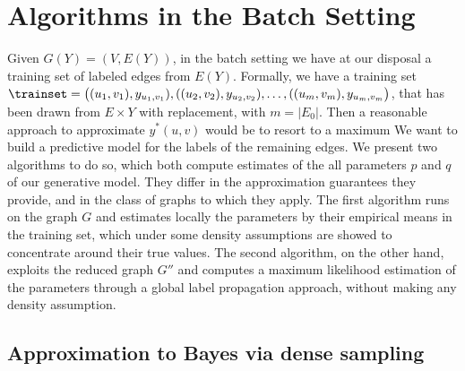 \section{Algorithms in the Batch Setting}\label{s:algbatch}

Given $G(Y) =(V,E(Y))$, in the batch setting we have at our disposal a training set \trainset{} of
labeled edges from $E(Y)$. Formally, we have a training set $\trainset
= \big((u_1,v_1),y_{u_1,v_1}), ((u_2,v_2),y_{u_2,v_2}), \ldots, ((u_m,v_m),y_{u_m,v_m}\big)$, that
has been drawn from $E\times Y$ \uar{} with replacement, with
$m = |E_0|$. Then a reasonable approach to approximate $y^*(u,v)$ would be to resort to a maximum
 We want to build a predictive model for the labels of the remaining
edges. We present two algorithms to do so, which both compute estimates of the all parameters $p$
and $q$ of our generative model. They differ in the approximation guarantees they provide, and in
the class of graphs to which they apply. The first algorithm runs on the graph $G$ and estimates
locally the parameters by their empirical means in the training set, which under some density
assumptions are showed to concentrate around their true values. The second algorithm, on the other
hand, exploits the reduced graph $G''$ and computes a maximum likelihood estimation of the
parameters through a global label propagation approach, without making any density assumption.

\subsection{Approximation to Bayes via dense sampling}\label{ss:bayes_approx}

